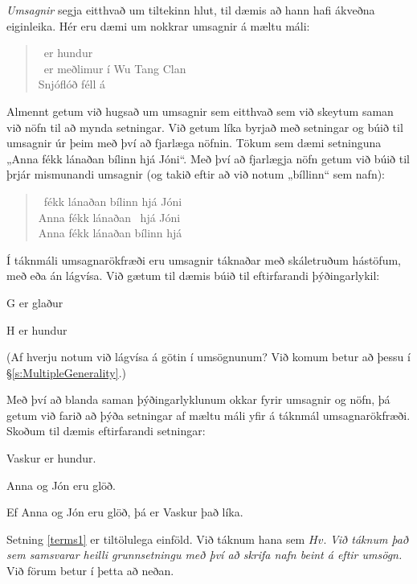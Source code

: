 \emph{Umsagnir} segja eitthvað um tiltekinn hlut, til dæmis að hann hafi ákveðna eiginleika. Hér eru dæmi um nokkrar umsagnir á mæltu máli:

	\begin{quote}
		\blank\ er hundur\\
		\blank\ er meðlimur í Wu Tang Clan\\
		Snjóflóð féll á \blank
	\end{quote}
Almennt getum við hugsað um umsagnir sem eitthvað sem við skeytum saman við nöfn til að mynda setningar. Við getum líka byrjað með setningar og búið til umsagnir úr þeim með því að fjarlæga nöfnin. Tökum sem dæmi setninguna „Anna fékk lánaðan bílinn hjá Jóni“. Með því að fjarlægja nöfn getum við búið til þrjár mismunandi umsagnir (og takið eftir að við notum „bíllinn“ sem nafn):
	\begin{quote}
		\blank\ fékk lánaðan bílinn hjá Jóni\\
		Anna fékk lánaðan \blank\ hjá Jóni\\
		Anna fékk lánaðan bílinn hjá \blank
	\end{quote}
	
Í táknmáli umsagnarökfræði eru umsagnir táknaðar með skáletruðum hástöfum, með eða án lágvísa. Við gætum til dæmis búið til eftirfarandi þýðingarlykil:
		\begin{ekey}
		\item[G]  er glaður
		\item[H]  er hundur
	\end{ekey}
(Af hverju notum við lágvísa á götin í umsögnunum? Við komum betur að þessu í \S\ref{s:MultipleGenerality}.)	

Með því að blanda saman þýðingarlyklunum okkar fyrir umsagnir og nöfn, þá getum við farið að þýða setningar af mæltu máli yfir á táknmál umsagnarökfræði. Skoðum til dæmis eftirfarandi setningar:
	\begin{earg}
		\item[\ex{terms1}] Vaskur er hundur.
		\item[\ex{terms2a}] Anna og Jón eru glöð.
		\item[\ex{terms2}] Ef Anna og Jón eru glöð, þá er Vaskur það líka.
	\end{earg}
Setning \ref{terms1} er tiltölulega einföld. Við táknum hana sem $Hv$. \emph{Við táknum það sem samsvarar heilli grunnsetningu með því að skrifa nafn beint á eftir umsögn.} Við förum betur í þetta að neðan.

